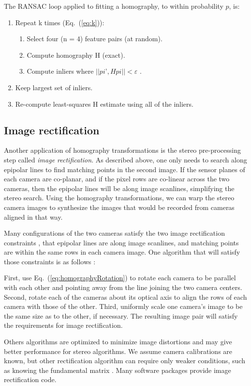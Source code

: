 The RANSAC loop applied to fitting a homography, to within probability $p$, is:
\begin{enumerate}
\item Repeat k times (Eq.~(\ref{eq:k})):
\begin{enumerate}
\item Select four (n = 4) feature pairs (at random).
\item Compute homography H (exact).
\item Compute inliers where $||pi’, H pi|| < ε $ .
\end{enumerate}
\item Keep largest set of inliers.
\item Re-compute least-squares H estimate using all of the inliers.
\end{enumerate}




\subsection{Image rectification}
Another application of homography transformations is the stereo pre-processing step called {\em image rectification}.  As described above, one only needs to search along epipolar lines to find matching points in the second image.  If the sensor planes of each camera are co-planar, and if the pixel rows are co-linear across the two cameras, then the epipolar lines will be along image scanlines, simplifying the stereo search.  Using the homography transformations, we can warp the stereo camera images to synthesize the images that would be recorded from cameras aligned in that way.

Many configurations of the two cameras satisfy the two image rectification constraints \cite{Zhang2003}, that epipolar lines are along image scanlines, and matching points are within the same rows in each camera image.  One algorithm that will satisfy those constraints is as follows \cite{wikiRectification}:  


First, use Eq.~(\ref{eq:homographyRotation}) to rotate each camera to be parallel with each other and pointing away from the line joining the two camera centers.  Second, rotate each of the cameras about its optical axis to align the rows of each camera with those of the other.  Third, uniformly scale one camera's image to be the same size as to the other, if necessary.  The resulting image pair will satisfy the requirements for image rectification.

Others algorithms are optimized to minimize image distortions \cite{Zhang2003} and may give better performance for stereo algorithms.  We assume camera calibrations are known, but other rectification algorithm can require only weaker conditions, such as knowing the fundamental matrix \cite{Hartley2004}. Many software packages provide image rectification code.

